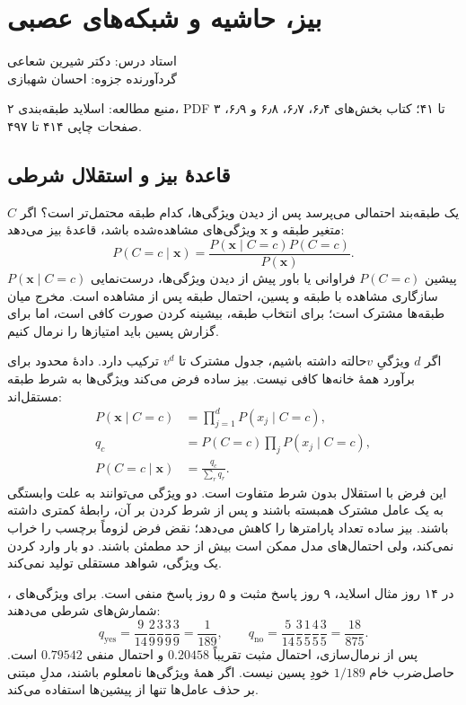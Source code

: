 \documentclass[12pt,a4paper,oneside]{report}
\newcounter{ex}[chapter]
\newenvironment{example}[1]{\refstepcounter{ex}\begin{tcolorbox}[breakable=false,title={مثال \thechapter.\arabic{ex} | #1},colframe=muted,colback=white]}{\end{tcolorbox}}
\newcommand{\source}[1]{\par{\small\color{muted} منبع مطالعه: #1}\par}
\begin{document}
\setcounter{chapter}{3}
\chapter{بیز، حاشیه و شبکه‌های عصبی}
\begin{center}{\small\color{muted} استاد درس: دکتر شیرین شعاعی\\[2mm] گردآورنده جزوه: احسان شهبازی}\end{center}

\source{اسلاید طبقه‌بندی ۲، PDF ۳ تا ۴۱؛ کتاب بخش‌های ۶٫۴، ۶٫۷، ۶٫۸ و ۶٫۹، صفحات چاپی ۴۱۴ تا ۴۹۷.}
\section{قاعدهٔ بیز و استقلال شرطی}
یک طبقه‌بند احتمالی می‌پرسد پس از دیدن ویژگی‌ها، کدام طبقه محتمل‌تر است؟ اگر $C$ متغیر طبقه و $\mathbf x$ ویژگی‌های مشاهده‌شده باشد، قاعدهٔ بیز می‌دهد:
\[P(C=c\mid\mathbf x)=\frac{P(\mathbf x\mid C=c)P(C=c)}{P(\mathbf x)}.\]
پیشین $P(C=c)$ فراوانی یا باور پیش از دیدن ویژگی‌ها، درست‌نمایی $P(\mathbf x\mid C=c)$ سازگاری مشاهده با طبقه و پسین، احتمال طبقه پس از مشاهده است. مخرج میان طبقه‌ها مشترک است؛ برای انتخاب طبقه، بیشینه کردن صورت کافی است، اما برای گزارش پسین باید امتیازها را نرمال کنیم.

اگر $d$ ویژگیِ $v$حالته داشته باشیم، جدول مشترک تا $v^d$ ترکیب دارد. دادهٔ محدود برای برآورد همهٔ خانه‌ها کافی نیست. بیز ساده فرض می‌کند ویژگی‌ها به شرط طبقه مستقل‌اند:
\begin{align*}
P(\mathbf x\mid C=c)&=\prod_{j=1}^dP(x_j\mid C=c),\\
q_c&=P(C=c)\prod_jP(x_j\mid C=c),\\
P(C=c\mid\mathbf x)&=\frac{q_c}{\sum_rq_r}.
\end{align*}
این فرض با استقلال بدون شرط متفاوت است. دو ویژگی می‌توانند به علت وابستگی به یک عامل مشترک همبسته باشند و پس از شرط کردن بر آن، رابطهٔ کمتری داشته باشند. بیز ساده تعداد پارامترها را کاهش می‌دهد؛ نقض فرض لزوماً برچسب را خراب نمی‌کند، ولی احتمال‌های مدل ممکن است بیش از حد مطمئن باشند. دو بار وارد کردن یک ویژگی، شواهد مستقلی تولید نمی‌کند.

\begin{example}{مثال گلف و محاسبهٔ پسین}
در ۱۴ روز مثال اسلاید، ۹ روز پاسخ مثبت و ۵ روز پاسخ منفی است. برای ویژگی‌های ، شمارش‌های شرطی می‌دهند:
\[q_{\mathrm{yes}}=\frac9{14}\frac29\frac39\frac39\frac39=\frac1{189},\qquad q_{\mathrm{no}}=\frac5{14}\frac35\frac15\frac45\frac35=\frac{18}{875}.\]
پس از نرمال‌سازی، احتمال مثبت تقریباً $0.20458$ و احتمال منفی $0.79542$ است. حاصل‌ضرب خام $1/189$ خودِ پسین نیست. اگر همهٔ ویژگی‌ها نامعلوم باشند، مدلِ مبتنی بر حذف عامل‌ها تنها از پیشین‌ها استفاده می‌کند.
\end{example}
\end{document}
